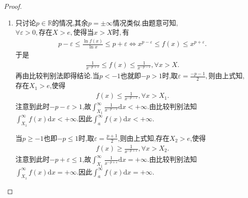 \documentclass[../../main.tex]{subfiles}%
\begin{document}
\begin{proof}
\begin{enumerate}[(1)]
\item 只讨论$p\in \mathbb{R}$的情况,其余$p=\pm \infty$情况类似.由题意可知,$\forall \varepsilon >0,\text{存在}X>e,\text{使得当}x>X\text{时},\text{有}$
\begin{align*}
p-\varepsilon \leqslant \frac{\ln f\left( x \right)}{\ln x}\leqslant p+\varepsilon \Longleftrightarrow x^{p-\varepsilon}\leqslant f\left( x \right) \leqslant x^{p+\varepsilon}.
\end{align*}
于是
\begin{align*}
\frac{1}{x^{-p+\varepsilon}}\leqslant f\left( x \right) \leqslant \frac{1}{x^{-p-\varepsilon}},\forall x>X.
\end{align*}
再由比较判别法即得结论.当$p<-1$也就即$-p>1$时,取$\varepsilon=\frac{-p-1}{2},$则由上式知,存在$X_1>e$,使得
\begin{align*}
f\left( x \right) \leqslant \frac{1}{x^{-p-\varepsilon}},\forall x>X_1.
\end{align*}
注意到此时$-p-\varepsilon>1$,故$\int_{X_1}^{\infty}{\frac{1}{x^{-p-\varepsilon}}\mathrm{d}x}<+\infty .$由比较判别法知$\int_{X_1}^{\infty}{f\left( x \right) \mathrm{d}x}<+\infty .$因此$\int_{a}^{\infty}{f\left( x \right) \mathrm{d}x}<+\infty .$

当$p\geqslant -1$也即$-p \leqslant 1$时,取$\varepsilon =\frac{p+1}{2}$,则由上式知,存在$X_2>e$,使得
\begin{align*}
f\left( x \right) \geqslant \frac{1}{x^{-p+\varepsilon}},\forall x>X_2.
\end{align*}
注意到此时$-p+\varepsilon \leqslant 1$,故$\int_{X_1}^{\infty}{\frac{1}{x^{-p+\varepsilon}}\mathrm{d}x}=+\infty .$由比较判别法知$\int_{X_1}^{\infty}{f\left( x \right) \mathrm{d}x}=+\infty .$因此$\int_{a}^{\infty}{f\left( x \right) \mathrm{d}x}=+\infty .$

\end{enumerate}

\end{proof}
\end{document}
